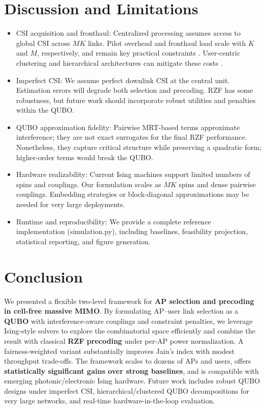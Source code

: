 \section{Discussion and Limitations}
\begin{itemize}
\item CSI acquisition and fronthaul: Centralized processing assumes access to global CSI across $MK$ links. Pilot overhead and fronthaul load scale with $K$ and $M$, respectively, and remain key practical constraints \cite{bjornson2016massive,demir2021foundations}. User-centric clustering and hierarchical architectures can mitigate these costs \cite{chen2020structured}.
\item Imperfect CSI: We assume perfect downlink CSI at the central unit. Estimation errors will degrade both selection and precoding. RZF has some robustness, but future work should incorporate robust utilities and penalties within the QUBO.
\item QUBO approximation fidelity: Pairwise MRT-based terms approximate interference; they are not exact surrogates for the final RZF performance. Nonetheless, they capture critical structure while preserving a quadratic form; higher-order terms would break the QUBO.
\item Hardware realizability: Current Ising machines support limited numbers of spins and couplings. Our formulation scales as $MK$ spins and dense pairwise couplings. Embedding strategies or block-diagonal approximations may be needed for very large deployments.
\item Runtime and reproducibility: We provide a complete reference implementation (simulation.py), including baselines, feasibility projection, statistical reporting, and figure generation.
\end{itemize}

\section{Conclusion}
We presented a flexible two-level framework for \textbf{AP selection and precoding in cell-free massive MIMO}. By formulating AP–user link selection as a \textbf{QUBO} with interference-aware couplings and constraint penalties, we leverage Ising-style solvers to explore the combinatorial space efficiently and combine the result with classical \textbf{RZF precoding} under per-AP power normalization. A fairness-weighted variant substantially improves Jain’s index with modest throughput trade-offs. The framework scales to dozens of APs and users, offers \textbf{statistically significant gains over strong baselines}, and is compatible with emerging photonic/electronic Ising hardware. Future work includes robust QUBO designs under imperfect CSI, hierarchical/clustered QUBO decompositions for very large networks, and real-time hardware-in-the-loop evaluation.




